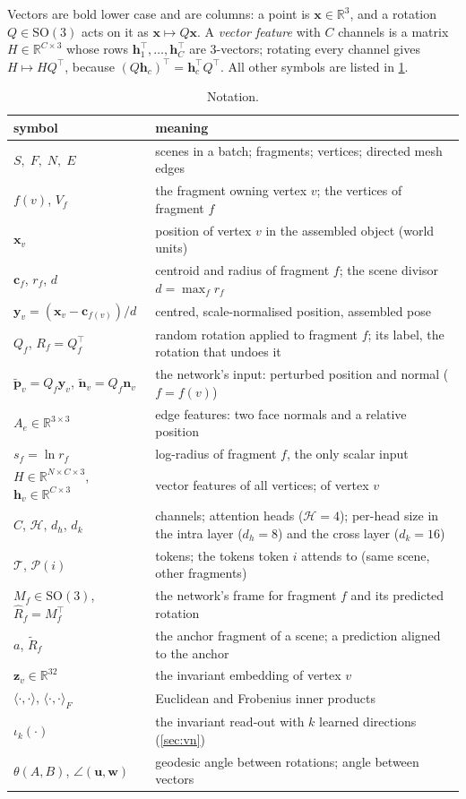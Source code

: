 \documentclass[11pt,a4paper]{article}
\theoremstyle{remark}
\newcommand{\R}{\mathbb{R}}
\newcommand{\SO}{\mathrm{SO}(3)}
\newcommand{\x}{\mathbf{x}}
\newcommand{\y}{\mathbf{y}}
\newcommand{\n}{\mathbf{n}}
\newcommand{\z}{\mathbf{z}}
\newcommand{\T}{^{\top}}
\newcommand{\ip}[2]{\langle #1,#2\rangle}
\begin{document}
Vectors are bold lower case and are columns: a point is $\x\in\R^3$, and a rotation $Q\in\SO$ acts on it as $\x\mapsto Q\x$. A \emph{vector feature} with $C$ channels is a matrix $H\in\R^{C\times 3}$ whose rows $\mathbf h_1\T,\dots,\mathbf h_C\T$ are 3-vectors; rotating every channel gives $H\mapsto HQ\T$, because $(Q\mathbf h_c)\T=\mathbf h_c\T Q\T$. All other symbols are listed in \cref{tab:notation}.

\begin{table}[htbp]
\centering\small
\caption{Notation.}
\label{tab:notation}
\begin{tabularx}{\linewidth}{@{}lX@{}}
\toprule
symbol & meaning \\
\midrule
$S,\;F,\;N,\;E$ & scenes in a batch; fragments; vertices; directed mesh edges \\
$f(v)$, $V_f$ & the fragment owning vertex $v$; the vertices of fragment $f$ \\
$\x_v$ & position of vertex $v$ in the assembled object (world units) \\
$\mathbf c_f$, $r_f$, $d$ & centroid and radius of fragment $f$; the scene divisor $d=\max_f r_f$ \\
$\y_v=(\x_v-\mathbf c_{f(v)})/d$ & centred, scale-normalised position, assembled pose \\
$Q_f$, $R_f=Q_f\T$ & random rotation applied to fragment $f$; its label, the rotation that undoes it \\
$\tilde{\mathbf p}_v=Q_f\y_v$, $\tilde{\n}_v=Q_f\n_v$ & the network's input: perturbed position and normal ($f=f(v)$) \\
$A_e\in\R^{3\times3}$ & edge features: two face normals and a relative position \\
$s_f=\ln r_f$ & log-radius of fragment $f$, the only scalar input \\
$H\in\R^{N\times C\times 3}$, $\mathbf h_v\in\R^{C\times3}$ & vector features of all vertices; of vertex $v$ \\
$C$, $\mathcal H$, $d_h$, $d_k$ & channels; attention heads ($\mathcal H=4$); per-head size in the intra layer ($d_h=8$) and the cross layer ($d_k=16$) \\
$\mathcal T$, $\mathcal P(i)$ & tokens; the tokens token $i$ attends to (same scene, other fragments) \\
$M_f\in\SO$, $\hat R_f=M_f\T$ & the network's frame for fragment $f$ and its predicted rotation \\
$a$, $\tilde R_f$ & the anchor fragment of a scene; a prediction aligned to the anchor \\
$\z_v\in\R^{32}$ & the invariant embedding of vertex $v$ \\
$\ip{\cdot}{\cdot}$, $\ip{\cdot}{\cdot}_F$ & Euclidean and Frobenius inner products \\
$\iota_k(\cdot)$ & the invariant read-out with $k$ learned directions (\cref{sec:vn}) \\
$\theta(A,B)$, $\angle(\mathbf u,\mathbf w)$ & geodesic angle between rotations; angle between vectors \\
\bottomrule
\end{tabularx}
\end{table}
\end{document}
